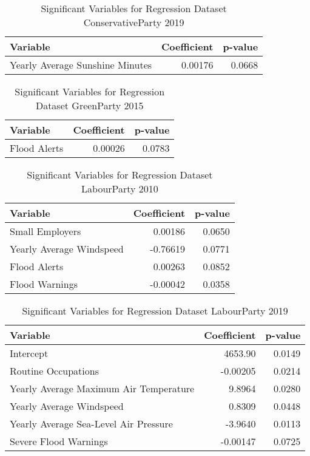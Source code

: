 \documentclass[12pt,letterpaper]{article}
\begin{document}
\begin{table}[h!]
	\caption{Significant Variables for Regression Dataset ConservativeParty 2019}
	\label{tab:cons2019}
	\centering
	\begin{tabular}{|l|r|r|}
		\hline
		\textbf{Variable} & \textbf{Coefficient} & \textbf{p-value} \\
		\hline
		Yearly Average Sunshine Minutes & 0.00176 & 0.0668 \\
		\hline
	\end{tabular}
\end{table}

\begin{table}[h!]
	\caption{Significant Variables for Regression Dataset GreenParty 2015}
	\label{tab:green2015}
	\centering
	\begin{tabular}{|l|r|r|}
		\hline
		\textbf{Variable} & \textbf{Coefficient} & \textbf{p-value} \\
		\hline
		Flood Alerts & 0.00026 & 0.0783 \\
		\hline
	\end{tabular}
\end{table}

\begin{table}[h!]
	\caption{Significant Variables for Regression Dataset LabourParty 2010}
	\label{tab:lab2010}
	\centering
	\begin{tabular}{|l|r|r|}
		\hline
		\textbf{Variable} & \textbf{Coefficient} & \textbf{p-value} \\
		\hline
		Small Employers & 0.00186 & 0.0650 \\
		Yearly Average Windspeed & -0.76619 & 0.0771 \\
		Flood Alerts & 0.00263 & 0.0852 \\
		Flood Warnings & -0.00042 & 0.0358 \\
		\hline
	\end{tabular}
\end{table}

\begin{table}[h!]
	\caption{Significant Variables for Regression Dataset LabourParty 2019}
	\label{tab:lab2019}
	\centering
	\begin{tabular}{|l|r|r|}
		\hline
		\textbf{Variable} & \textbf{Coefficient} & \textbf{p-value} \\
		\hline
		Intercept & 4653.90 & 0.0149 \\
		Routine Occupations & -0.00205 & 0.0214 \\
		Yearly Average Maximum Air Temperature & 9.8964 & 0.0280 \\
		Yearly Average Windspeed & 0.8309 & 0.0448 \\
		Yearly Average  Sea-Level Air Pressure & -3.9640 & 0.0113 \\
		Severe Flood Warnings & -0.00147 & 0.0725 \\
		\hline
	\end{tabular}
\end{table}
\end{document}
